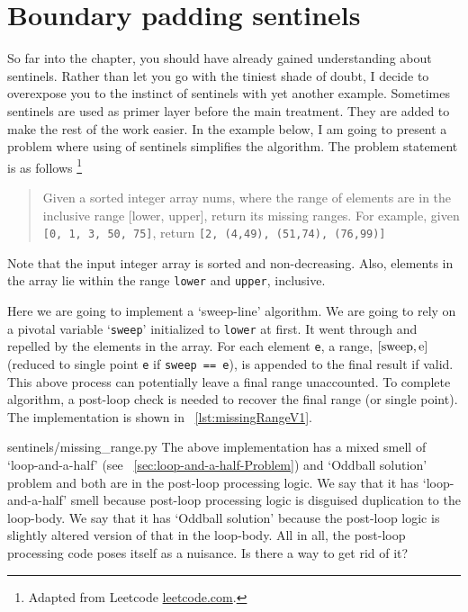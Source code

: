 \documentclass[oneside,11pt]{book}
\makeatletter
\let\LaTeXAtSign=\@
\let\@=\relax
\let\@=\LaTeXAtSign
\theoremstyle{definition}
\theoremstyle{remark}
\newcommand{\code}[1]{\mbox{\lstinline{#1}}}
\makeatother
\begin{document}
\section{Boundary padding sentinels}\label{sec:boundaryPaddingSentinels}

So far into the chapter, you should have already gained understanding about sentinels.
Rather than let you go with the tiniest shade of doubt,
I decide to overexpose you to the instinct of sentinels with yet another example.
Sometimes sentinels are used as primer layer before the main treatment.
They are added to make the rest of the work easier.
In the example below, I am going to present a problem where using of sentinels simplifies the
algorithm.
The problem statement is as follows \footnote{Adapted from Leetcode \url{leetcode.com}.}
\begin{quote}
    Given a sorted integer array nums, where the range of elements are
    in the inclusive range [lower, upper], return its missing ranges.
    For example, given \code{[0, 1, 3, 50, 75]}, return \code{[2, (4,49), (51,74), (76,99)]}
\end{quote}
Note that the input integer array is sorted and non-decreasing.
Also, elements in the array lie within the range \code{lower} and \code{upper}, inclusive.

Here we are going to implement a `sweep-line' algorithm.
We are going to rely on a pivotal variable `\code{sweep}' initialized to \code{lower} at first.
It went through and repelled by the elements in the array.
For each element \code{e}, a range, $[\code{sweep}, \code{e}]$ (reduced to single point
\code{e} if \code{sweep == e}), is appended to the final result if valid.
This above process can potentially leave a final range unaccounted.
To complete algorithm, a post-loop check is needed to recover the final range (or single point).
The implementation is shown in ~\autoref{lst:missingRangeV1}.

{sentinels/missing_range.py}
The above implementation has a mixed smell of `loop-and-a-half'
(see ~\autoref{sec:loop-and-a-half-Problem}) and `Oddball solution' problem\@\cite{Fowler1999}
and both are in the post-loop processing logic.
We say that it has `loop-and-a-half' smell because post-loop processing logic is disguised
duplication to the loop-body.
We say that it has `Oddball solution' because the post-loop logic is slightly altered version of
that in the loop-body.
All in all, the post-loop processing code poses itself as a nuisance.
Is there a way to get rid of it?
\end{document}
